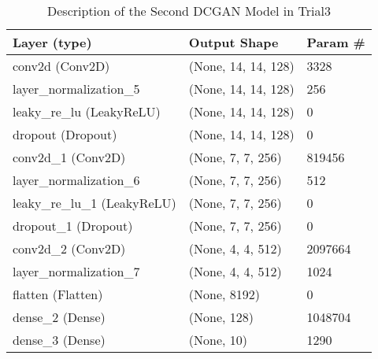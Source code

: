 \documentclass{article}
\begin{document}
\begin{table}[h]
\centering
\begin{tabular}{|l|l|l|}
\hline
\textbf{Layer (type)}           & \textbf{Output Shape} & \textbf{Param \#} \\
\hline
conv2d (Conv2D)                 & (None, 14, 14, 128)   & 3328 \\
layer\_normalization\_5         & (None, 14, 14, 128)   & 256 \\
leaky\_re\_lu (LeakyReLU)       & (None, 14, 14, 128)   & 0 \\
dropout (Dropout)               & (None, 14, 14, 128)   & 0 \\
conv2d\_1 (Conv2D)               & (None, 7, 7, 256)     & 819456 \\
layer\_normalization\_6         & (None, 7, 7, 256)     & 512 \\
leaky\_re\_lu\_1 (LeakyReLU)     & (None, 7, 7, 256)     & 0 \\
dropout\_1 (Dropout)             & (None, 7, 7, 256)     & 0 \\
conv2d\_2 (Conv2D)               & (None, 4, 4, 512)     & 2097664 \\
layer\_normalization\_7         & (None, 4, 4, 512)     & 1024 \\
flatten (Flatten)               & (None, 8192)          & 0 \\
dense\_2 (Dense)                 & (None, 128)           & 1048704 \\
dense\_3 (Dense)                 & (None, 10)            & 1290 \\
\hline
\end{tabular}
\caption{Description of the Second DCGAN Model in Trial3}
\label{table:model2}
\end{table}
\end{document}
